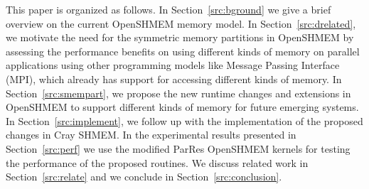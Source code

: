 This paper is organized as follows. In Section~\ref{src:bground} we give a
brief overview on the current OpenSHMEM memory model. In
Section~\ref{src:drelated}, we motivate the need for the symmetric memory
partitions in OpenSHMEM by assessing the performance benefits on using
different kinds of memory on parallel applications using other programming
models like Message Passing Interface~\cite{mpi} (MPI), which already has
support for accessing different kinds of memory. In Section~\ref{src:smempart},
we propose the new runtime changes and extensions in OpenSHMEM to support
different kinds of memory for future emerging systems. In
Section~\ref{src:implement}, we follow up with the implementation of the
proposed changes in Cray SHMEM. In the experimental results presented in
Section~\ref{src:perf} we use the modified ParRes OpenSHMEM kernels for
testing the performance of the proposed routines. We discuss related work
in Section~\ref{src:relate} and we conclude in Section~\ref{src:conclusion}.